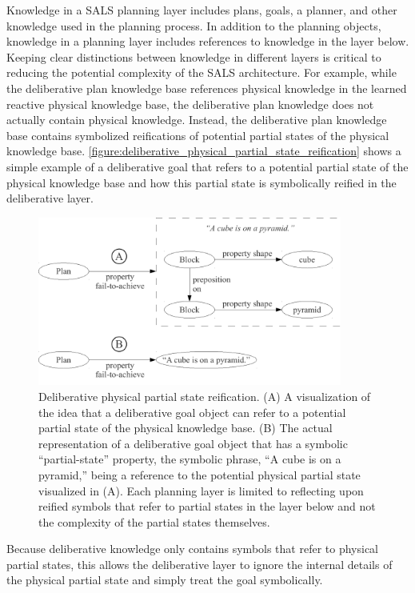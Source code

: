 Knowledge in a SALS planning layer includes plans, goals, a planner,
and other knowledge used in the planning process.  In addition to the
planning objects, knowledge in a planning layer includes references to
knowledge in the layer below.  Keeping clear distinctions between
knowledge in different layers is critical to reducing the potential
complexity of the SALS architecture.  For example, while the
deliberative plan knowledge base references physical knowledge in the
learned reactive physical knowledge base, the deliberative plan
knowledge does not actually contain physical knowledge.  Instead, the
deliberative plan knowledge base contains symbolized reifications of
potential partial states of the physical knowledge base.
{\mbox{\autoref{figure:deliberative_physical_partial_state_reification}}}
shows a simple example of a deliberative goal that refers to a
potential partial state of the physical knowledge base and how this
partial state is symbolically reified in the deliberative layer.
\begin{figure}
\centering
\includegraphics[width=10cm]{gfx/deliberative_physical_partial_state_reification}
\caption[Deliberative physical partial state
  reification.]{Deliberative physical partial state reification.  (A)
  A visualization of the idea that a deliberative goal object can
  refer to a potential partial state of the physical knowledge base.
  (B) The actual representation of a deliberative goal object that has
  a symbolic ``partial-state'' property, the symbolic phrase, ``A cube
  is on a pyramid,'' being a reference to the potential physical
  partial state visualized in (A).  Each planning layer is limited to
  reflecting upon reified symbols that refer to partial states in the
  layer below and not the complexity of the partial states
  themselves.}
\label{figure:deliberative_physical_partial_state_reification}
\end{figure}
Because deliberative knowledge only contains symbols that refer to
physical partial states, this allows the deliberative layer to ignore
the internal details of the physical partial state and simply treat
the goal symbolically.

